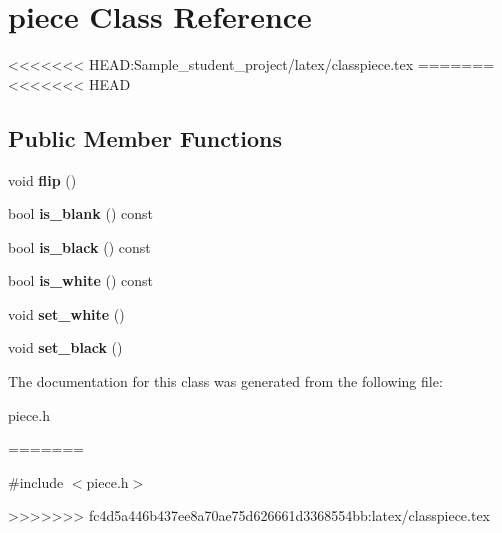 \hypertarget{classpiece}{}\section{piece Class Reference}
\label{classpiece}
<<<<<<< HEAD:Sample_student_project/latex/classpiece.tex
=======
<<<<<<< HEAD
\subsection*{Public Member Functions}
\begin{DoxyCompactItemize}
\item 
void {\bfseries flip} ()\hypertarget{classpiece_ab898c5827a5859e4cddc9d61a814a873}{}\label{classpiece_ab898c5827a5859e4cddc9d61a814a873}

\item 
bool {\bfseries is\+\_\+blank} () const \hypertarget{classpiece_af8e5afd9e1eb6b367c7da643c94c7113}{}\label{classpiece_af8e5afd9e1eb6b367c7da643c94c7113}

\item 
bool {\bfseries is\+\_\+black} () const \hypertarget{classpiece_abb229bd7452561f1f3aa794e5561aa60}{}\label{classpiece_abb229bd7452561f1f3aa794e5561aa60}

\item 
bool {\bfseries is\+\_\+white} () const \hypertarget{classpiece_a229a0c4b29e449350b2c3ba019e6c9a9}{}\label{classpiece_a229a0c4b29e449350b2c3ba019e6c9a9}

\item 
void {\bfseries set\+\_\+white} ()\hypertarget{classpiece_a31480899f2a591fdb22d97933303e19d}{}\label{classpiece_a31480899f2a591fdb22d97933303e19d}

\item 
void {\bfseries set\+\_\+black} ()\hypertarget{classpiece_a273d63d07b6ea973b2fc4f7e1b56ea10}{}\label{classpiece_a273d63d07b6ea973b2fc4f7e1b56ea10}

\end{DoxyCompactItemize}


The documentation for this class was generated from the following file\+:\begin{DoxyCompactItemize}
\item 
piece.\+h\end{DoxyCompactItemize}
=======


{\ttfamily \#include $<$piece.\+h$>$}

>>>>>>> fc4d5a446b437ee8a70ae75d626661d3368554bb:latex/classpiece.tex
